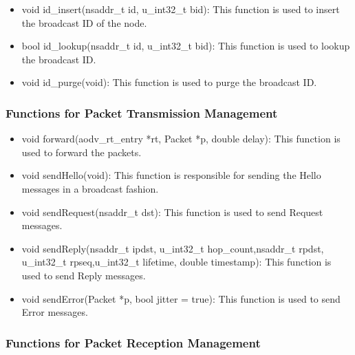 \documentclass[times,10pt,onecolumn]{article}
\begin{document}
\begin{itemize}
\item void id\_insert(nsaddr\_t id, u\_int32\_t bid): This function is used to insert the broadcast ID of the node.
\item bool id\_lookup(nsaddr\_t id, u\_int32\_t bid): This function is used to lookup the broadcast ID.
\item void id\_purge(void): This function is used to purge the broadcast ID.
\end{itemize}

\vspace{20pt}

\subsubsection{Functions for Packet Transmission Management}
\label{sec:funtransmission}

\begin{itemize}
\item void forward(aodv\_rt\_entry *rt, Packet *p, double delay): This function is used to forward the packets.
\item void sendHello(void): This function is responsible for sending the Hello messages in a broadcast fashion.
\item void sendRequest(nsaddr\_t dst): This function is used to send Request messages.
\item void sendReply(nsaddr\_t ipdst, u\_int32\_t hop\_count,nsaddr\_t rpdst, u\_int32\_t rpseq,u\_int32\_t lifetime, double timestamp): This function is used to send Reply messages.
\item void sendError(Packet *p, bool jitter = true): This function is used to send Error messages.
\end{itemize}                                       

\vspace{20pt}

\subsubsection{Functions for Packet Reception Management}
\label{sec:funreception}
\end{document}
